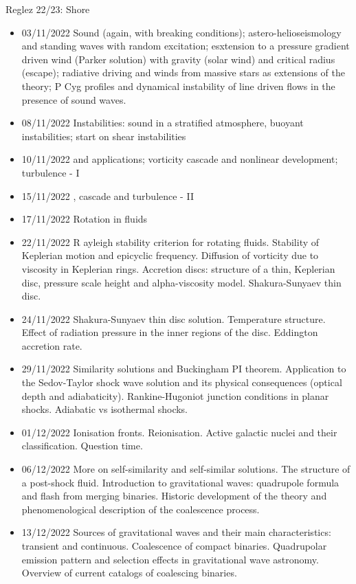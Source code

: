 \begin{frame}[allowframebreaks]{Reglez 22/23: Shore}
\begin{itemize}
\item 03/11/2022 Sound (again, with breaking conditions); astero-helioseismology and standing waves with random excitation; esxtension to a pressure gradient driven wind (Parker solution) with gravity (solar wind) and critical radius (escape); radiative driving and winds from massive stars as extensions of the theory; P Cyg profiles and dynamical instability of line driven flows in the presence of sound waves. 
\item 08/11/2022 Instabilities: sound in a stratified atmosphere, buoyant instabilities; start on shear instabilities 
\item 10/11/2022   and applications; vorticity cascade and nonlinear development; turbulence - I 
\item 15/11/2022 , cascade and turbulence - II 
\item 17/11/2022 Rotation in fluids
\item 22/11/2022 R ayleigh stability criterion for rotating fluids. Stability of Keplerian motion and epicyclic frequency. Diffusion of vorticity due to viscosity in Keplerian rings. Accretion discs: structure of a thin, Keplerian disc, pressure scale height and alpha-viscosity model. Shakura-Sunyaev thin disc. 
\item 24/11/2022 Shakura-Sunyaev thin disc solution. Temperature structure. Effect of radiation pressure in the inner regions of the disc. Eddington accretion rate. 
\item 29/11/2022 Similarity solutions and Buckingham PI theorem. Application to the Sedov-Taylor shock wave solution and its physical consequences (optical depth and adiabaticity). Rankine-Hugoniot junction conditions in planar shocks. Adiabatic vs isothermal shocks. 
\item 01/12/2022 Ionisation fronts. Reionisation. Active galactic nuclei and their classification. Question time.                                                                       \item 06/12/2022 More on self-similarity and self-similar solutions. The structure of a post-shock fluid. Introduction to gravitational waves: quadrupole formula and flash from merging binaries. Historic development of the theory and phenomenological description of the coalescence process. 
\item 13/12/2022 Sources of gravitational waves and their main characteristics: transient and continuous. Coalescence of compact binaries. Quadrupolar emission pattern and selection effects in gravitational wave astronomy. Overview of current catalogs of coalescing binaries. 
\end{itemize}
\end{frame}

